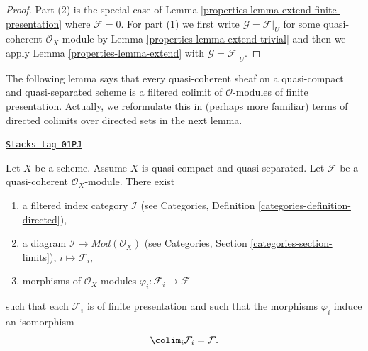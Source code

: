 \begin{proof}

Part (2) is the special case of Lemma \ref{properties-lemma-extend-finite-presentation}
where $\mathcal{F} = 0$. For part (1) we first write
$\mathcal{G} = \mathcal{F}|_U$ for some quasi-coherent $\mathcal{O}_X$-module
by Lemma \ref{properties-lemma-extend-trivial}
and then we apply Lemma \ref{properties-lemma-extend} with $\mathcal{G} = \mathcal{F}|_U$.
\end{proof}

The following lemma says that every quasi-coherent sheaf on a quasi-compact
and quasi-separated scheme is a filtered colimit of $\mathcal{O}$-modules
of finite presentation. Actually, we reformulate this in (perhaps more
familiar) terms of directed colimits over directed sets in the next lemma.

\begin{lemma}
\label{properties-lemma-directed-colimit-diagram-finite-presentation}
\href{https://stacks.math.columbia.edu/tag/01PJ}{\texttt{Stacks tag 01PJ}}


Let $X$ be a scheme. Assume $X$ is quasi-compact and quasi-separated.
Let $\mathcal{F}$ be a quasi-coherent $\mathcal{O}_X$-module.
There exist
\begin{enumerate}
\item a filtered index category $\mathcal{I}$ (see
Categories, Definition \ref{categories-definition-directed}),
\item a diagram $\mathcal{I} \to \textit{Mod}(\mathcal{O}_X)$ (see
Categories, Section \ref{categories-section-limits}),
$i \mapsto \mathcal{F}_i$,
\item morphisms of $\mathcal{O}_X$-modules
$\varphi_i : \mathcal{F}_i \to \mathcal{F}$
\end{enumerate}
such that each $\mathcal{F}_i$ is of finite presentation
and such that the morphisms $\varphi_i$ induce an isomorphism
$$
\colim_i \mathcal{F}_i
=
\mathcal{F}.
$$
\end{lemma}

